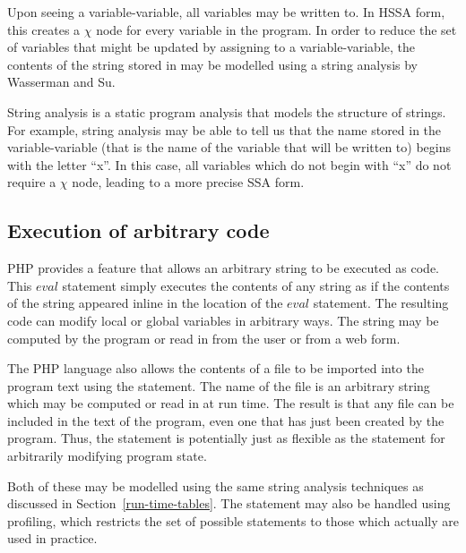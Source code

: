 Upon seeing a variable-variable, all variables may be written to.  In
HSSA form, this creates a $\chi$ node for every variable in the
program.  In order to reduce the set of variables that might be
updated by assigning to a variable-variable, the contents of the
string stored in  may be modelled using a string analysis
by Wasserman and Su.

 String analysis is a static program analysis that models the structure
 of strings.  For example, string analysis may be able to tell us that
 the name stored in the variable-variable (that is the name of the
 variable that will be written to) begins with the letter ``x''.  In
 this case, all variables which do not begin with ``x'' do not require a
 $\chi$ node, leading to a more precise SSA form.

\subsection{Execution of arbitrary code}
PHP provides a feature that allows an arbitrary string to be executed
as code. This $\textit{eval}$ statement simply executes the contents of any
string as if the contents of the string appeared inline in the
location of the $\textit{eval}$ statement. The resulting code can modify local
or global variables in arbitrary ways. The string may be computed by
the program or read in from the user or from a web form.

The PHP language also allows the contents of a file to be imported
into the program text using the  statement. The name of the
file is an arbitrary string which may be computed or read in at run
time. The result is that any file can be included in the text of the
program, even one that has just been created by the program.  Thus,
the  statement is potentially just as flexible as the
 statement for arbitrarily modifying program state.

Both of these may be modelled using the same string analysis
techniques as discussed in Section~\ref{run-time-tables}.  The  statement may also be handled
using profiling, which restricts the set of possible
 statements to those which actually are used in practice.

